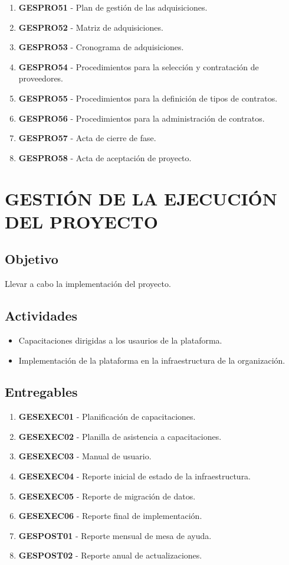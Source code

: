 \begin{enumerate}
	\item \textbf{GESPRO51} - Plan de gesti\'on de las adquisiciones.
	\item \textbf{GESPRO52} - Matriz de adquisiciones.
	\item \textbf{GESPRO53} - Cronograma de adquisiciones.
	\item \textbf{GESPRO54} - Procedimientos para la selecci\'on y contrataci\'on de proveedores.
	\item \textbf{GESPRO55} - Procedimientos para la definici\'on de tipos de contratos.
	\item \textbf{GESPRO56} - Procedimientos para la administraci\'on de contratos.
	\item \textbf{GESPRO57} - Acta de cierre de fase.
	\item \textbf{GESPRO58} - Acta de aceptaci\'on de proyecto.
\end{enumerate}

\chapter{GESTI\'ON DE LA EJECUCI\'ON DEL PROYECTO}

\section{Objetivo}
Llevar a cabo la implementaci\'on del proyecto.

\section{Actividades}
\begin{itemize}
	\item Capacitaciones dirigidas a los usaurios de la plataforma.
	
	\item Implementaci\'on de la plataforma en la infraestructura de la organizaci\'on.	
\end{itemize}

\section{Entregables}

\begin{enumerate}
	\item \textbf{GESEXEC01} - Planificaci\'on de capacitaciones.
	\item \textbf{GESEXEC02} - Planilla de asistencia a capacitaciones.
	\item \textbf{GESEXEC03} - Manual de usuario.
	\item \textbf{GESEXEC04} - Reporte inicial de estado de la infraestructura.
	\item \textbf{GESEXEC05} - Reporte de migraci\'on de datos.
	\item \textbf{GESEXEC06} - Reporte final de implementaci\'on.

	\item \textbf{GESPOST01} - Reporte mensual de mesa de ayuda.
	\item \textbf{GESPOST02} - Reporte anual de actualizaciones.
\end{enumerate}